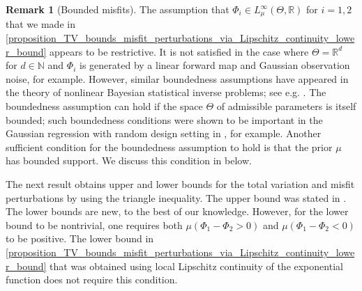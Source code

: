 \documentclass[a4paper]{scrartcl}
\theoremstyle{definition}
\newtheorem{remark}[theorem]{Remark}
\numberwithin{equation}{section}
\newcommand{\R}{\mathbb{R}}
\newcommand{\N}{\mathbb{N}}
\begin{document}
\begin{remark}[Bounded misfits]
 \label{remark_bounded_misfits}
 The assumption that $\Phi_i\in L^\infty_\mu(\Theta,\R)$ for $i=1,2$ that we made in \cref{proposition_TV_bounds_misfit_perturbations_via_Lipschitz_continuity_lower_bound} appears to be restrictive.
 It is not satisfied in the case where $\Theta=\R^d$ for $d\in\N$ and $\Phi_i$ is generated by a linear forward map and Gaussian observation noise, for example. 
 However, similar boundedness assumptions have appeared in the theory of nonlinear Bayesian statistical inverse problems; see e.g. \cite[equation (1.17)]{Nickl2023}. 
 The boundedness assumption can hold if the space $\Theta$ of admissible parameters is itself bounded; such boundedness conditions were shown to be important in the Gaussian regression with random design setting in \cite{Birge2004}, for example. 
 Another sufficient condition for the boundedness assumption to hold is that the prior $\mu$ has bounded support.
 We discuss this condition in  below.
\end{remark}


The next result obtains upper and lower bounds for the total variation and misfit perturbations by using the triangle inequality.
The upper bound was stated in \cite[Theorem 8]{Sprungk2020}.
The lower bounds are new, to the best of our knowledge. 
However, for the lower bound to be nontrivial, one requires both $\mu(\Phi_1-\Phi_2>0)$ and $\mu(\Phi_1-\Phi_2<0)$ to be positive. 
The lower bound in \ref{proposition_TV_bounds_misfit_perturbations_via_Lipschitz_continuity_lower_bound} that was obtained using local Lipschitz continuity of the exponential function does not require this condition.
\end{document}
